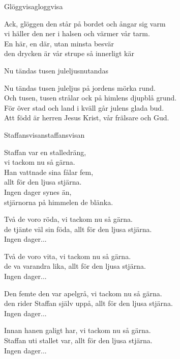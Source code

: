 \begin{song}{Glöggvisa}{gloggvisa}
\begin{vers}
Ack, glöggen den står på bordet och ångar sig varm\\
vi häller den ner i halsen och värmer vår tarm.\\
En här, en där, utan minsta besvär\\
den drycken är vår strupe så innerligt kär\\
\end{vers}
\end{song}

\begin{song}{Nu tändas tusen juleljus}{nutandas}
\begin{vers}
Nu tändas tusen juleljus på jordens mörka rund.\\
Och tusen, tusen strålar ock på himlens djupblå grund.\\
För över stad och land i kväll går julens glada bud.\\
Att född är herren Jesus Krist, vår frälsare och Gud.
\end{vers}
\end{song}

\begin{song}{Staffansvisan}{staffansvisan}
\begin{vers}
Staffan var en stalledräng,\\
vi tackom nu så gärna.\\
Han vattnade sina fålar fem,\\
allt för den ljusa stjärna.\\
Ingen dager synes än,\\
stjärnorna på himmelen de blänka.\\
\end{vers}
\begin{vers}
Två de voro röda, vi tackom nu så gärna.\\
de tjänte väl sin föda, allt för den ljusa stjärna.\\
Ingen dager...\\
\end{vers}
\begin{vers}
Två de voro vita, vi tackom nu så gärna.\\
de va varandra lika, allt för den ljusa stjärna.\\
Ingen dager...\\
\end{vers}
\begin{vers}
Den femte den var apelgrå, vi tackom nu så gärna.\\
den rider Staffan själv uppå, allt för den ljusa stjärna.\\
Ingen dager...\\
\end{vers}
\begin{vers}
Innan hanen galigt har, vi tackom nu så gärna.\\
Staffan uti stallet var, allt för den ljusa stjärna.\\
Ingen dager...\\
\end{vers}
\end{song}
\newpage

